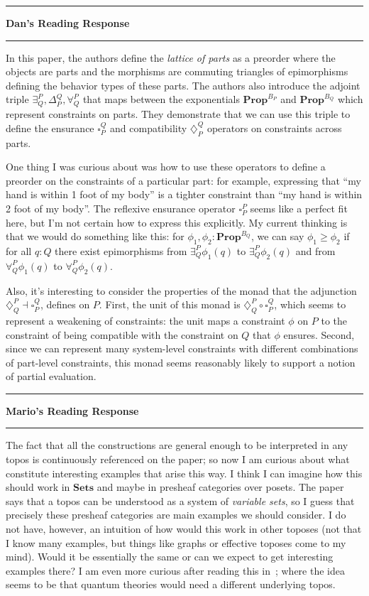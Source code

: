 \documentclass{amsart}
\newcommand{\iam}[1]{
  \vspace{0.25em}
  \hrule
  \vspace{0.25em}
  \textbf{{#1}'s Reading Response}
  \vspace{0.25em}
  \hrule
  \vspace{1em}
}
\begin{document}
\iam{Dan}

In this paper, the authors define the \textit{lattice of parts} as a preorder where the objects are parts and the morphisms are commuting triangles of epimorphisms defining the behavior types of these parts. The authors also introduce the adjoint triple $\exists_{Q}^P, \Delta_{P}^Q, \forall_{Q}^P$ that maps between the exponentials $\textbf{Prop}^{B_{P}}$ and $\textbf{Prop}^{B_{Q}}$ which represent constraints on parts. They demonstrate that we can use this triple to define the ensurance $\square_{P}^Q$ and compatibility $\diamondsuit_{P}^Q$ operators on constraints across parts.

One thing I was curious about was how to use these operators to define a preorder on the constraints of a particular part: for example, expressing that ``my hand is within 1 foot of my body'' is a tighter constraint than ``my hand is within 2 foot of my body''. The reflexive ensurance operator $\square_{P}^P$ seems like a perfect fit here, but I'm not certain how to express this explicitly. My current thinking is that we would do something like this: for $\phi_1, \phi_2 : \textbf{Prop}^{B_{Q}}$, we can say $\phi_1 \geq \phi_2$ if for all $q : Q$ there exist epimorphisms from $\exists_{Q}^P \phi_1(q)$ to $\exists_{Q}^P \phi_2(q)$ and from $\forall_{Q}^P \phi_1(q)$ to $\forall_{Q}^P \phi_2(q)$.

Also, it's interesting to consider the properties of the monad that the adjunction $\diamondsuit_{Q}^P \dashv \square_{P}^Q$, defines on $P$. First, the unit of this monad is $\diamondsuit_{Q}^P \circ \square_{P}^Q$, which seems to represent a weakening of constraints: the unit maps a constraint $\phi$ on $P$ to the constraint of being compatible with the constraint on $Q$ that $\phi$ ensures. Second, since we can represent many system-level constraints with different combinations of part-level constraints, this monad seems reasonably likely to support a notion of partial evaluation.


\iam{Mario}

The fact that all the constructions are general enough to be
interpreted in any topos is continuously referenced on the paper; so
now I am curious about what constitute interesting examples that arise
this way.  I think I can imagine how this should work in
$\mathbf{Sets}$ and maybe in presheaf categories over posets. The
paper says that a topos can be understood as a system of
\textit{variable sets}, so I guess that precisely these presheaf
categories are main examples we should consider. I do not have,
however, an intuition of how would this work in other toposes (not
that I know many examples, but things like graphs or effective toposes
come to my mind).  Would it be essentially the same or can we expect
to get interesting examples there?  I am even more curious after
reading this in~\cite{whatIsAThingDoering}; where the idea seems to be that quantum
theories would need a different underlying topos.
\end{document}
